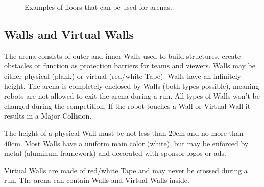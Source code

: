 \begin{figure} [h!]
\begin{center}
		 \hspace{0.1cm}
		 \hspace{0.1cm}
	\end{center}
	\caption{Examples of floors that can be used for \RCAW arenas.}
	\label{fig:example_floors}
\end{figure}





\subsection{Walls and Virtual Walls}
\label{subsec: Walls and virtual Walls}

The arena consists of outer and inner Walls used to build structures, create obstacles or function as protection barriers for teams and viewers. Walls may be either physical (plank) or virtual (red/white Tape). Walls have an infinitely height.
The arena is completely enclosed by Walls (both types possible), meaning robots are not allowed to exit the arena during a run. All types of Walls won't be changed during the competition. If the robot touches a Wall or Virtual Wall it results in a Major Collision.

The height of a physical Wall must be not less than $20\si{\centi\meter}$ and no more than $40\si{\centi\meter}$.
Most Walls have a uniform main color (white), but may be enforced by metal (aluminum framework) and decorated with sponsor logos or ads.

Virtual Walls are made of red/white Tape and may never be crossed during a run. The arena can contain Walls and Virtual Walls inside.

